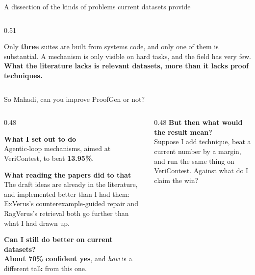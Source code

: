 \documentclass[aspectratio=169,10pt]{beamer}
\newcommand{\hd}[1]{\textbf{\color{lgTeal}#1}}
\begin{document}
\begin{frame}{A dissection of the kinds of problems current datasets provide}
\begin{columns}[T]
\begin{column}{0.51\textwidth}
\begin{callout}[lgAccent]
\scriptsize
Only \textbf{three} suites are built from systems code, and only one of them is substantial.
A mechanism is only visible on hard tasks, and the field has very few. \textbf{What the
literature lacks is relevant datasets, more than it lacks proof techniques.}
\end{callout}
\end{column}
\end{columns}

\end{frame}

\begin{frame}{So Mahadi, can you improve ProofGen or not?}

\begin{columns}[T]
\begin{column}{0.48\textwidth}
{\scriptsize
\hd{What I set out to do}\\
Agentic-loop mechanisms, aimed at VeriContest, to beat \textbf{13.95\%}.

\vspace{5pt}
\hd{What reading the papers did to that}\\
The draft ideas are already in the literature, and implemented better than I had them:
ExVerus's counterexample-guided repair and RagVerus's retrieval both go further than what I had
drawn up.

\vspace{5pt}
\hd{Can I still do better on current datasets?}\\
\textbf{About 70\% confident yes}, and \emph{how} is a different talk from this one.
}
\end{column}

\begin{column}{0.48\textwidth}
{\scriptsize
\hd{But then what would the result mean?}\\
Suppose I add technique, beat a current number by a margin, and run the same thing on
VeriContest. Against what do I claim the win?
}


\end{column}
\end{columns}
\end{frame}
\end{document}
